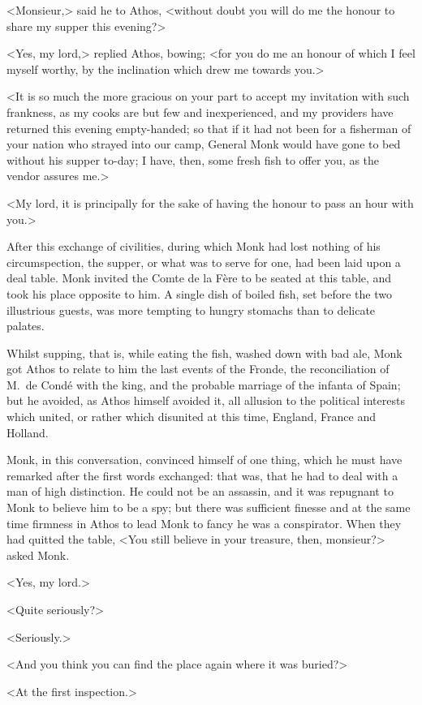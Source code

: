 <Monsieur,> said he to Athos, <without doubt you will do me the honour to share my supper this evening?>

<Yes, my lord,> replied Athos, bowing; <for you do me an honour of which I feel myself worthy, by the inclination which drew me towards you.>

<It is so much the more gracious on your part to accept my invitation with such frankness, as my cooks are but few and inexperienced, and my providers have returned this evening empty-handed; so that if it had not been for a fisherman of your nation who strayed into our camp, General Monk would have gone to bed without his supper to-day; I have, then, some fresh fish to offer you, as the vendor assures me.>

<My lord, it is principally for the sake of having the honour to pass an hour with you.>

After this exchange of civilities, during which Monk had lost nothing of his circumspection, the supper, or what was to serve for one, had been laid upon a deal table. Monk invited the Comte de la Fère to be seated at this table, and took his place opposite to him. A single dish of boiled fish, set before the two illustrious guests, was more tempting to hungry stomachs than to delicate palates.

Whilst supping, that is, while eating the fish, washed down with bad ale, Monk got Athos to relate to him the last events of the Fronde, the reconciliation of M.~de Condé with the king, and the probable marriage of the infanta of Spain; but he avoided, as Athos himself avoided it, all allusion to the political interests which united, or rather which disunited at this time, England, France and Holland.

Monk, in this conversation, convinced himself of one thing, which he must have remarked after the first words exchanged: that was, that he had to deal with a man of high distinction. He could not be an assassin, and it was repugnant to Monk to believe him to be a spy; but there was sufficient finesse and at the same time firmness in Athos to lead Monk to fancy he was a conspirator. When they had quitted the table, <You still believe in your treasure, then, monsieur?> asked Monk.

<Yes, my lord.>

<Quite seriously?>

<Seriously.>

<And you think you can find the place again where it was buried?>

<At the first inspection.>

